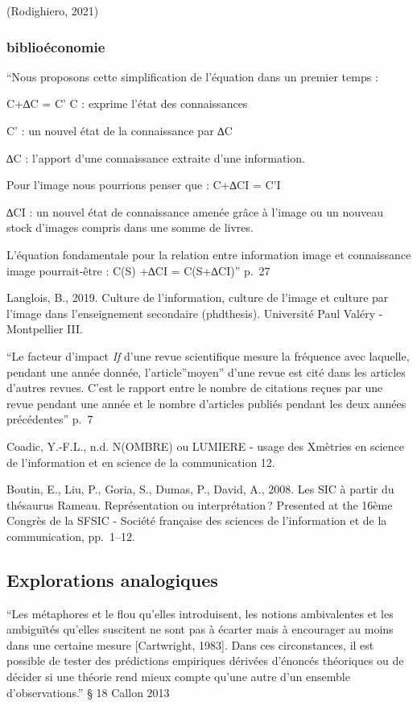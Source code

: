 \documentclass[
  a4paper,
  DIV=11,
  numbers=noendperiod]{scrreprt}
\begin{document}
(Rodighiero, 2021)

\subsubsection{biblioéconomie}\label{bibliouxe9conomie}

``Nous proposons cette simplification de l'équation dans un premier
temps :

C+∆C = C' C : exprime l'état des connaissances

C' : un nouvel état de la connaissance par ∆C

∆C : l'apport d'une connaissance extraite d'une information.

Pour l'image nous pourrions penser que : C+∆CI = C'I

∆CI : un nouvel état de connaissance amenée grâce à l'image ou un
nouveau stock d'images compris dans une somme de livres.

L'équation fondamentale pour la relation entre information image et
connaissance image pourrait-être : C(S) +∆CI = C(S+∆CI)'' p.~27

Langlois, B., 2019. Culture de l'information, culture de l'image et
culture par l'image dans l'enseignement secondaire (phdthesis).
Université Paul Valéry - Montpellier III.

``Le facteur d'impact \emph{If} d'une revue scientifique mesure la
fréquence avec laquelle, pendant une année donnée, l'article''moyen''
d'une revue est cité dans les articles d'autres revues. C'est le rapport
entre le nombre de citations reçues par une revue pendant une année et
le nombre d'articles publiés pendant les deux années précédentes'' p.~7

Coadic, Y.-F.L., n.d. N(OMBRE) ou LUMIERE - usage des Xmètries en
science de l'information et en science de la communication 12.

Boutin, E., Liu, P., Goria, S., Dumas, P., David, A., 2008. Les SIC à
partir du thésaurus Rameau. Représentation ou interprétation\,?
Presented at the 16ème Congrès de la SFSIC - Société française des
sciences de l'information et de la communication, pp.~1--12.

\subsection{Explorations analogiques}\label{explorations-analogiques}

``Les métaphores et le flou qu'elles introduisent, les notions
ambivalentes et les ambiguïtés qu'elles suscitent ne sont pas à écarter
mais à encourager au moins dans une certaine mesure {[}Cartwright,
1983{]}. Dans ces circonstances, il est possible de tester des
prédictions empiriques dérivées d'énoncés théoriques ou de décider si
une théorie rend mieux compte qu'une autre d'un ensemble
d'observations.'' § 18 Callon 2013
\end{document}
